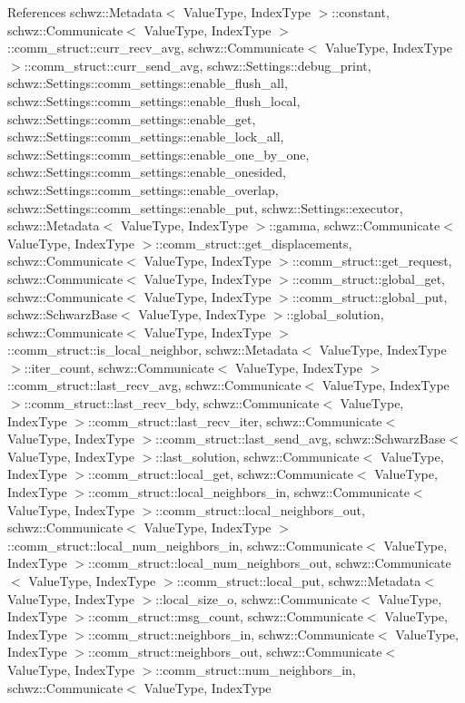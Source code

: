 References schwz\+::\+Metadata$<$ Value\+Type, Index\+Type $>$\+::constant, schwz\+::\+Communicate$<$ Value\+Type, Index\+Type $>$\+::comm\+\_\+struct\+::curr\+\_\+recv\+\_\+avg, schwz\+::\+Communicate$<$ Value\+Type, Index\+Type $>$\+::comm\+\_\+struct\+::curr\+\_\+send\+\_\+avg, schwz\+::\+Settings\+::debug\+\_\+print, schwz\+::\+Settings\+::comm\+\_\+settings\+::enable\+\_\+flush\+\_\+all, schwz\+::\+Settings\+::comm\+\_\+settings\+::enable\+\_\+flush\+\_\+local, schwz\+::\+Settings\+::comm\+\_\+settings\+::enable\+\_\+get, schwz\+::\+Settings\+::comm\+\_\+settings\+::enable\+\_\+lock\+\_\+all, schwz\+::\+Settings\+::comm\+\_\+settings\+::enable\+\_\+one\+\_\+by\+\_\+one, schwz\+::\+Settings\+::comm\+\_\+settings\+::enable\+\_\+onesided, schwz\+::\+Settings\+::comm\+\_\+settings\+::enable\+\_\+overlap, schwz\+::\+Settings\+::comm\+\_\+settings\+::enable\+\_\+put, schwz\+::\+Settings\+::executor, schwz\+::\+Metadata$<$ Value\+Type, Index\+Type $>$\+::gamma, schwz\+::\+Communicate$<$ Value\+Type, Index\+Type $>$\+::comm\+\_\+struct\+::get\+\_\+displacements, schwz\+::\+Communicate$<$ Value\+Type, Index\+Type $>$\+::comm\+\_\+struct\+::get\+\_\+request, schwz\+::\+Communicate$<$ Value\+Type, Index\+Type $>$\+::comm\+\_\+struct\+::global\+\_\+get, schwz\+::\+Communicate$<$ Value\+Type, Index\+Type $>$\+::comm\+\_\+struct\+::global\+\_\+put, schwz\+::\+Schwarz\+Base$<$ Value\+Type, Index\+Type $>$\+::global\+\_\+solution, schwz\+::\+Communicate$<$ Value\+Type, Index\+Type $>$\+::comm\+\_\+struct\+::is\+\_\+local\+\_\+neighbor, schwz\+::\+Metadata$<$ Value\+Type, Index\+Type $>$\+::iter\+\_\+count, schwz\+::\+Communicate$<$ Value\+Type, Index\+Type $>$\+::comm\+\_\+struct\+::last\+\_\+recv\+\_\+avg, schwz\+::\+Communicate$<$ Value\+Type, Index\+Type $>$\+::comm\+\_\+struct\+::last\+\_\+recv\+\_\+bdy, schwz\+::\+Communicate$<$ Value\+Type, Index\+Type $>$\+::comm\+\_\+struct\+::last\+\_\+recv\+\_\+iter, schwz\+::\+Communicate$<$ Value\+Type, Index\+Type $>$\+::comm\+\_\+struct\+::last\+\_\+send\+\_\+avg, schwz\+::\+Schwarz\+Base$<$ Value\+Type, Index\+Type $>$\+::last\+\_\+solution, schwz\+::\+Communicate$<$ Value\+Type, Index\+Type $>$\+::comm\+\_\+struct\+::local\+\_\+get, schwz\+::\+Communicate$<$ Value\+Type, Index\+Type $>$\+::comm\+\_\+struct\+::local\+\_\+neighbors\+\_\+in, schwz\+::\+Communicate$<$ Value\+Type, Index\+Type $>$\+::comm\+\_\+struct\+::local\+\_\+neighbors\+\_\+out, schwz\+::\+Communicate$<$ Value\+Type, Index\+Type $>$\+::comm\+\_\+struct\+::local\+\_\+num\+\_\+neighbors\+\_\+in, schwz\+::\+Communicate$<$ Value\+Type, Index\+Type $>$\+::comm\+\_\+struct\+::local\+\_\+num\+\_\+neighbors\+\_\+out, schwz\+::\+Communicate$<$ Value\+Type, Index\+Type $>$\+::comm\+\_\+struct\+::local\+\_\+put, schwz\+::\+Metadata$<$ Value\+Type, Index\+Type $>$\+::local\+\_\+size\+\_\+o, schwz\+::\+Communicate$<$ Value\+Type, Index\+Type $>$\+::comm\+\_\+struct\+::msg\+\_\+count, schwz\+::\+Communicate$<$ Value\+Type, Index\+Type $>$\+::comm\+\_\+struct\+::neighbors\+\_\+in, schwz\+::\+Communicate$<$ Value\+Type, Index\+Type $>$\+::comm\+\_\+struct\+::neighbors\+\_\+out, schwz\+::\+Communicate$<$ Value\+Type, Index\+Type $>$\+::comm\+\_\+struct\+::num\+\_\+neighbors\+\_\+in, schwz\+::\+Communicate$<$ Value\+Type, Index\+Type 